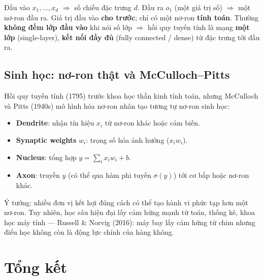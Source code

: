 \documentclass[12pt,a4paper]{article}
\begin{document}
\begin{dinhnghia}[title={Mạng một lớp kết nối đầy đủ}]
Đầu vào $x_1, \ldots, x_d$ $\Rightarrow$ số chiều đặc trưng $d$. Đầu ra $o_1$ (một giá trị số) $\Rightarrow$ một nơ-ron đầu ra. Giá trị đầu vào \textbf{cho trước}; chỉ có một nơ-ron \textbf{tính toán}. Thường \textbf{không đếm lớp đầu vào} khi nói số lớp $\Rightarrow$ hồi quy tuyến tính là mạng \textbf{một lớp} (single-layer), \textbf{kết nối đầy đủ} (fully connected / dense) từ đặc trưng tới đầu ra.
\end{dinhnghia}

\subsection{Sinh học: nơ-ron thật và McCulloch--Pitts}

\begin{ynghia}[title={Liên hệ sinh học (không phải động lực chính ngày nay)}]
Hồi quy tuyến tính (1795) trước khoa học thần kinh tính toán, nhưng McCulloch và Pitts (1940s) mô hình hóa nơ-ron nhân tạo tương tự nơ-ron sinh học:
\begin{itemize}
  \item \textbf{Dendrite}: nhận tín hiệu $x_i$ từ nơ-ron khác hoặc cảm biến.
  \item \textbf{Synaptic weights} $w_i$: trọng số hóa ảnh hưởng ($x_i w_i$).
  \item \textbf{Nucleus}: tổng hợp $y = \sum_i x_i w_i + b$.
  \item \textbf{Axon}: truyền $y$ (có thể qua hàm phi tuyến $\sigma(y)$) tới cơ bắp hoặc nơ-ron khác.
\end{itemize}
Ý tưởng: nhiều đơn vị kết hợi đúng cách có thể tạo hành vi phức tạp hơn một nơ-ron. Tuy nhiên, học sâu hiện đại lấy cảm hứng mạnh từ toán, thống kê, khoa học máy tính --- Russell \& Norvig (2016): máy bay lấy cảm hứng từ chim nhưng điểu học không còn là động lực chính của hàng không.
\end{ynghia}

\newpage

\section{Tổng kết}
\end{document}
